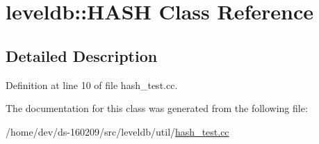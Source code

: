 \hypertarget{classleveldb_1_1_h_a_s_h}{}\section{leveldb\+:\+:H\+A\+S\+H Class Reference}
\label{classleveldb_1_1_h_a_s_h}


\subsection{Detailed Description}


Definition at line 10 of file hash\+\_\+test.\+cc.



The documentation for this class was generated from the following file\+:\begin{DoxyCompactItemize}
\item 
/home/dev/ds-\/160209/src/leveldb/util/\hyperlink{hash__test_8cc}{hash\+\_\+test.\+cc}\end{DoxyCompactItemize}
